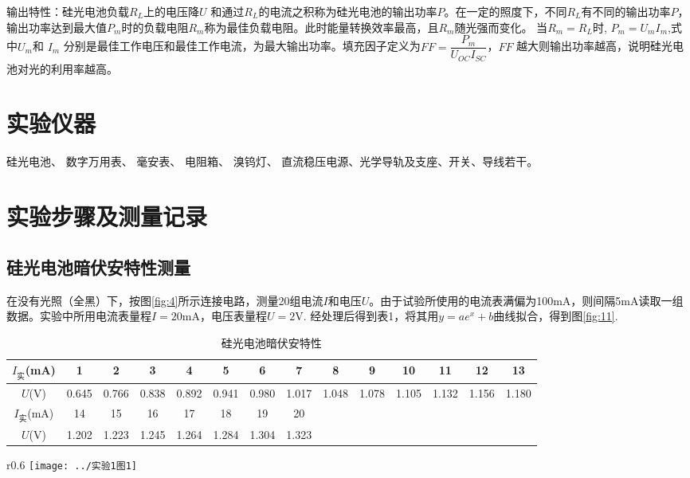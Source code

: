 \documentclass[11pt]{article}
\begin{document}
\heiti 输出特性：\songti 硅光电池负载$  R_L $上的电压降$ U $ 和通过$  R_L $的电流之积称为硅光电池的输出功率$  P  $。在一定的照度下，不同$  R_L $有不同的输出功率$  P  $，输出功率达到最大值$  P_m  $时的负载电阻$  R_m  $称为最佳负载电阻。此时能量转换效率最高，且$ R_m $随光强而变化。 当$ R_m=R_L $时, $ P_m=U_mI_m $,式中$ U_m  $和 $ I_m $ 分别是最佳工作电压和最佳工作电流，为最大输出功率。填充因子定义为$ FF=\dfrac{P_m}{U_{OC}I_{SC}} $，$ FF $ 越大则输出功率越高，说明硅光电池对光的利用率越高。
\section{实验仪器}
硅光电池、 数字万用表、 毫安表、 电阻箱、 溴钨灯、 直流稳压电源、光学导轨及支座、开关、导线若干。
\section{实验步骤及测量记录}
\subsection{硅光电池暗伏安特性测量}
在没有光照（全黑）下，按图\ref{fig:4}所示连接电路，测量20组电流$ I $和电压$ U $。由于试验所使用的电流表满偏为100mA，则间隔5mA读取一组数据。实验中所用电流表量程$ I=20\text{mA} $，电压表量程$ U=2\text{V} $.
经处理后得到表1，将其用$ y=ae^x+b $曲线拟合，得到图\ref{fig:11}.

\begin{table}[htbp]\small
	\label{table1}
	\caption{硅光电池暗伏安特性}
	\begin{tabular}{cccccccccccccc}
		\toprule
		$ I_{\text{实}} $(mA) & 1     & 2     & 3     & 4     & 5     & 6     & 7     & 8     & 9     & 10    & 11    & 12    & 13    \\
		\midrule
		$ U $(V)  & 0.645 & 0.766 & 0.838 & 0.892 & 0.941 & 0.980 & 1.017 & 1.048 & 1.078 & 1.105 & 1.132 & 1.156 & 1.180 \\
		\toprule
		$ I_{\text{实}} $(mA) & 14    & 15    & 16    & 17    & 18    & 19    & 20    &       &       &       &       &       &       \\
		\midrule
		$ U $(V)  & 1.202 & 1.223 & 1.245 & 1.264 & 1.284 & 1.304 & 1.323 &       &       &       &       &       & \\
		\bottomrule     
	\end{tabular}
\end{table}

\begin{wrapfigure}{r}{0.6\linewidth}
	\centering
	\texttt{[image: ../实验1图1]}
	\caption{硅光电池暗伏安特性曲线}
	\label{fig:11}
\end{wrapfigure}
\end{document}
